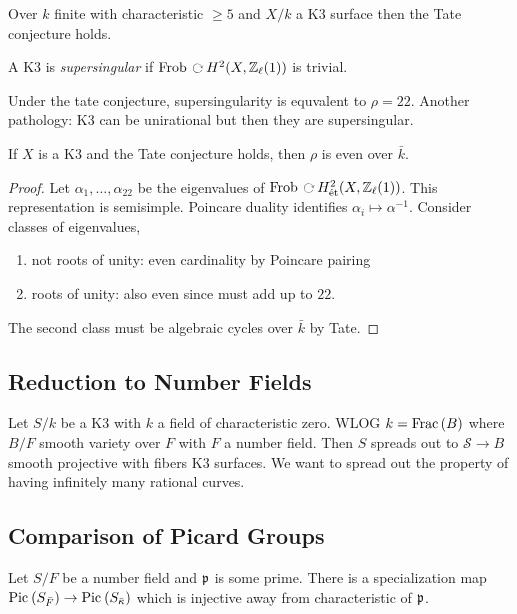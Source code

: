 \documentclass[12pt]{article}
\begin{document}
\begin{theorem}[Charles]
Over $k$ finite with characteristic $\ge 5$ and $X/k$ a K3 surface then the Tate conjecture holds. 
\end{theorem}

\begin{defn}
A K3 is \textit{supersingular} if $\Frob \acts H^2(X, \Z_\ell(1))$ is trivial. 
\end{defn}

Under the tate conjecture, supersingularity is equvalent to $\rho = 22$. Another pathology: K3 can be unirational but then they are supersingular. 

\begin{prop}
If $X$ is a K3 and the Tate conjecture holds, then $\rho$ is even over $\bar{k}$.
\end{prop}

\begin{proof}
Let $\alpha_1, \dots, \alpha_{22}$ be the eigenvalues of $\Frob \acts H^2_{\et}(X, \Z_{\ell}(1))$. This representation is semisimple. Poincare duality identifies $\alpha_i \mapsto \alpha^{-1}$. Consider classes of eigenvalues,
\begin{enumerate}
\item not roots of unity: even cardinality by Poincare pairing
\item roots of unity: also even since must add up to $22$.
\end{enumerate}
The second class must be algebraic cycles over $\bar{k}$ by Tate. 
\end{proof}

\subsection{Reduction to Number Fields}

Let $S / k$ be a K3 with $k$ a field of characteristic zero. WLOG $k = \mathrm{Frac}\left(B\right)$ where $B/F$ smooth variety over $F$ with $F$ a number field. Then $S$ spreads out to $\mathcal{S} \to B$ smooth projective with fibers K3 surfaces. We want to spread out the property of having infinitely many rational curves. 

\subsection{Comparison of Picard Groups}

\begin{theorem}
Let $S / F$ be a number field and $\mathfrak{p}$ is some prime. There is a specialization map $\mathrm{Pic}^{} \left( S_{\bar{F}} \right) \to \mathrm{Pic}^{} \left( S_{\bar{\kappa}} \right)$ which is injective away from characteristic of $\mathfrak{p}$.
\end{theorem}
\end{document}
